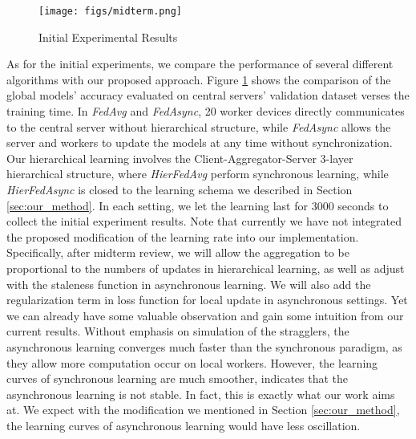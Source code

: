\documentclass[10pt,twocolumn,letterpaper]{article}
\theoremstyle{definition}
\begin{document}
\begin{figure}[ht!]
    \centering
    \texttt{[image: figs/midterm.png]}
    \caption{Initial Experimental Results}
    \label{fig:midterm}
\end{figure}



As for the initial experiments, we compare the performance of several different algorithms with our proposed approach. %
Figure \ref{fig:midterm} shows the comparison of the global models' accuracy evaluated on central servers' validation dataset verses the training time. In \textit{FedAvg} and \textit{FedAsync}, 20 worker devices directly communicates to the central server without hierarchical structure, while \textit{FedAsync} allows the server and workers to update the models at any time without synchronization. Our hierarchical learning involves the Client-Aggregator-Server 3-layer hierarchical structure, where \textit{HierFedAvg} perform synchronous learning, while \textit{HierFedAsync} is closed to the learning schema we described in Section \ref{sec:our_method}. 
In each setting, we let the learning last for 3000 seconds to collect the initial experiment results. 
Note that currently we have not integrated the proposed modification of the learning rate into our implementation. Specifically, after midterm review, we will allow the aggregation to be proportional to the numbers of updates in hierarchical learning, as well as adjust with the staleness function in asynchronous learning. We will also add the regularization term in loss function for local update in asynchronous settings. Yet we can already have some valuable observation and gain some intuition from our current results. Without emphasis on simulation of the stragglers, the asynchronous learning converges much faster than the synchronous paradigm, as they allow more computation occur on local workers. However, the learning curves of synchronous learning are much smoother, indicates that the asynchronous learning is not stable. In fact, this is exactly what our work aims at. We expect with the modification we mentioned in Section \ref{sec:our_method}, the learning curves of asynchronous learning would have less oscillation.
\end{document}
